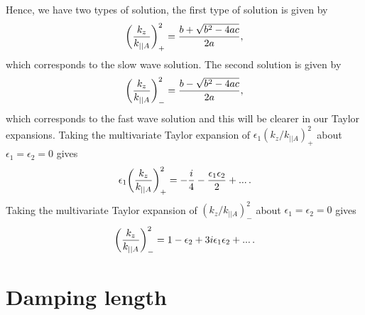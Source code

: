 Hence, we have two types of solution, the first type of solution is given by
\begin{equation}
    \label{eq:apdx_k_z+}
    \qty(\frac{k_z}{k_{||A}})_+^2 = \frac{b+\sqrt{b^2-4ac}}{2a},
\end{equation}
which corresponds to the slow wave solution. The second solution is given by
\begin{equation}
    \label{eq:apdx_k_z-}
    \qty(\frac{k_z}{k_{||A}})_-^2 = \frac{b-\sqrt{b^2-4ac}}{2a},
\end{equation}
which corresponds to the fast wave solution and this will be clearer in our Taylor expansions. Taking the multivariate Taylor expansion of $\epsilon_1(k_z/k_{||A})_+^2$ about $\epsilon_1=\epsilon_2=0$ gives
\begin{equation}
    \epsilon_1\qty(\frac{k_z}{k_{||A}})_+^2 = -\frac{i}{4} - \frac{\epsilon_1 \epsilon_2}{2} + ...\,.
\end{equation}
Taking the multivariate Taylor expansion of $(k_z/k_{||A})_-^2$ about $\epsilon_1=\epsilon_2=0$ gives
\begin{equation}
    \label{eq:apdx_k_z-_taylor}
    \qty(\frac{k_z}{k_{||A}})_-^2 = 1 - \epsilon_2  + 3i\epsilon_1\epsilon_2 + ...\,.
\end{equation}

\section{Damping length}

